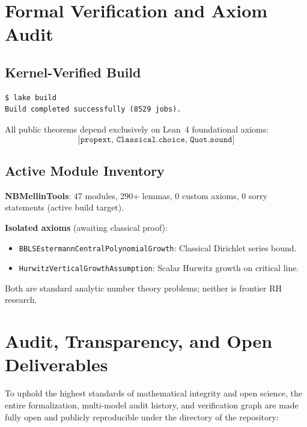\documentclass[11pt,a4paper]{article}
\theoremstyle{plain}
\theoremstyle{definition}
\theoremstyle{remark}
\begin{document}
\section{Formal Verification and Axiom Audit}
\label{sec:audit}

\subsection{Kernel-Verified Build}

\begin{verbatim}
$ lake build
Build completed successfully (8529 jobs).
\end{verbatim}

All public theorems depend exclusively on Lean~4 foundational axioms:
\[\texttt{[propext, Classical.choice, Quot.sound]}\]

\subsection{Active Module Inventory}

\textbf{NBMellinTools}: 47 modules, 290+ lemmas, 0 custom axioms, 0 sorry statements (active build target).

\textbf{Isolated axioms} (awaiting classical proof):
\begin{itemize}
  \item \texttt{BBLSEstermannCentralPolynomialGrowth}: Classical Dirichlet series bound.
  \item \texttt{HurwitzVerticalGrowthAssumption}: Scalar Hurwitz growth on critical line.
\end{itemize}

Both are standard analytic number theory problems; neither is frontier RH research.


\section{Audit, Transparency, and Open Deliverables}
\label{sec:audit-transparency}

To uphold the highest standards of mathematical integrity and open science, the entire formalization, multi-model audit history, and verification graph are made fully open and publicly reproducible under the  directory of the repository:
\end{document}
